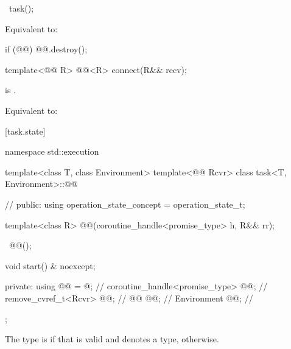 %
\begin{itemdecl}
~task();
\end{itemdecl}
\begin{itemdescr}
\pnum
\effects
Equivalent to:
\begin{codeblock}
if (@@)
  @@.destroy();
\end{codeblock}
\end{itemdescr}

%
\begin{itemdecl}
template<@@ R>
  @@<R> connect(R&& recv);
\end{itemdecl}
\begin{itemdescr}
\pnum
\expects
{} is .

\pnum
\effects
Equivalent to: 
\end{itemdescr}

[task.state]{}

\begin{codeblock}
namespace std::execution {
  template<class T, class Environment>
  template<@@ Rcvr>
  class task<T, Environment>::@@ {           // \expos
  public:
    using operation_state_concept = operation_state_t;

    template<class R>
      @@(coroutine_handle<promise_type> h, R&& rr);

    ~@@();

    void start() & noexcept;

private:
    using @@ = @\seebelownc@;                // \expos
    coroutine_handle<promise_type> @@;      // \expos
    remove_cvref_t<Rcvr>           @@;        // \expos
    @@                      @@;     // \expos
    Environment                    @@; // \expos
  };
}
\end{codeblock}

\pnum
The type  is  if that
 is valid and denotes a type,  otherwise.

